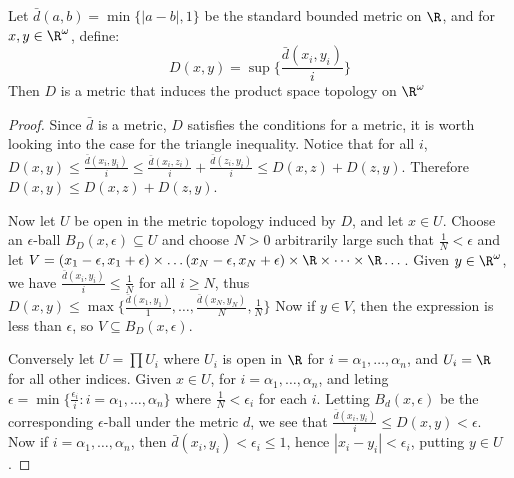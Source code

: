 \begin{theorem}\label{2.2.9}
    Let $\bar{d}(a,b)=\min\{|a-b|,1\}$ be the standard bounded metric on $\R$,
    and for  $x,y \in \R^\omega$, define:
    \begin{equation}
        D(x,y) = \sup\{\frac{\bar{d}(x_i,y_i)}{i}\}
    \end{equation}
    Then $D$ is a metric that induces the product space topology on $\R^\omega$
\end{theorem}
\begin{proof}
    Since $\bar{d}$ is a metric, $D$ satisfies the conditions for a metric, it
    is worth looking into the case for the triangle inequality. Notice that for
    all  $i$,  $D(x,y) \leq \frac{\bar{d}(x_i,y_i)}{i} \leq
    \frac{\bar{d}(x_i,z_i)}{i}+\frac{\bar{d}(z_i,y_i)}{i} \leq D(x,z)+D(z,y)$.
    Therefore $D(x,y) \leq D(x,z)+D(z,y)$.

    Now let $U$ be open in the metric topology induced by  $D$, and let  $x \in
    U$. Choose an  $\epsilon$-ball  $B_D(x,\epsilon) \subseteq U$ and choose
    $N>0$ arbitrarily large such that  $\frac{1}{N}<\epsilon$ and let
    $V=(x_1-\epsilon, x_1+\epsilon) \times \dots (x_N-\epsilon, x_N+\epsilon)
    \times \R \times \dots \times \R \dots$. Given $y \in \R^\omega$, we have
    $\frac{\bar{d}(x_i,y_i)}{i} \leq \frac{1}{N}$ for all $i \geq N$, thus
    $D(x,y) \leq \max\{\frac{\bar{d}(x_1,y_1)}{1}, \dots,
        \frac{\bar{d}(x_N,y_N)}{N}, \frac{1}{N}\}$ Now if $y \in V$, then the
        expression is less than  $\epsilon$, so  $V \subseteq B_D(x, \epsilon)$.

        Conversely let $U=\prod{U_i}$ where $U_i$ is open in  $\R$ for  $i =
        \alpha_1, \dots, \alpha_n$, and $U_i=\R$ for all other indices. Given
        $x \in U$, for $i=\alpha_1, \dots, \alpha_n$, and leting $\epsilon=
        \min\{\frac{\epsilon_i}{i} : i=\alpha_1, \dots, \alpha_n \}$ where
        $\frac{1}{N} < \epsilon_i$ for each $i$. Letting  $B_d(x,\epsilon)$ be
        the corresponding $\epsilon$-ball under the metric $d$, we see that
        $\frac{\bar{d}(x_i,y_i)}{i} \leq D(x,y)<\epsilon$. Now if $i=\alpha_1,
        \dots, \alpha_n$, then  $\bar{d}(x_i,y_i)<\epsilon_i \leq 1$, hence
        $|x_i-y_i|<\epsilon_i$, putting  $y \in U$.
\end{proof}
